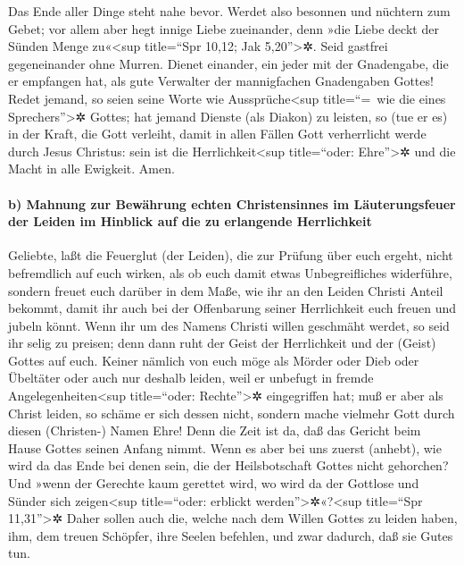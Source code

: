  Das Ende aller Dinge steht nahe bevor. Werdet also
besonnen und nüchtern zum Gebet;  vor allem aber hegt
innige Liebe zueinander, denn »die Liebe deckt der Sünden Menge
zu«\textless sup title=``Spr 10,12; Jak 5,20''\textgreater✲.
 Seid gastfrei gegeneinander ohne Murren. 
Dienet einander, ein jeder mit der Gnadengabe, die er empfangen hat, als
gute Verwalter der mannigfachen Gnadengaben Gottes! 
Redet jemand, so seien seine Worte wie Aussprüche\textless sup
title=``=~wie die eines Sprechers''\textgreater✲ Gottes; hat jemand
Dienste (als Diakon) zu leisten, so (tue er es) in der Kraft, die Gott
verleiht, damit in allen Fällen Gott verherrlicht werde durch Jesus
Christus: sein ist die Herrlichkeit\textless sup title=``oder:
Ehre''\textgreater✲ und die Macht in alle Ewigkeit. Amen.

\hypertarget{b-mahnung-zur-bewuxe4hrung-echten-christensinnes-im-luxe4uterungsfeuer-der-leiden-im-hinblick-auf-die-zu-erlangende-herrlichkeit}{%
\paragraph{b) Mahnung zur Bewährung echten Christensinnes im
Läuterungsfeuer der Leiden im Hinblick auf die zu erlangende
Herrlichkeit}\label{b-mahnung-zur-bewuxe4hrung-echten-christensinnes-im-luxe4uterungsfeuer-der-leiden-im-hinblick-auf-die-zu-erlangende-herrlichkeit}}

 Geliebte, laßt die Feuerglut (der Leiden), die zur
Prüfung über euch ergeht, nicht befremdlich auf euch wirken, als ob euch
damit etwas Unbegreifliches widerführe,  sondern freuet
euch darüber in dem Maße, wie ihr an den Leiden Christi Anteil bekommt,
damit ihr auch bei der Offenbarung seiner Herrlichkeit euch freuen und
jubeln könnt.  Wenn ihr um des Namens Christi willen
geschmäht werdet, so seid ihr selig zu preisen; denn dann ruht der Geist
der Herrlichkeit und der (Geist) Gottes auf euch.  Keiner
nämlich von euch möge als Mörder oder Dieb oder Übeltäter oder auch nur
deshalb leiden, weil er unbefugt in fremde Angelegenheiten\textless sup
title=``oder: Rechte''\textgreater✲ eingegriffen hat; muß er aber als
Christ leiden,  so schäme er sich dessen nicht, sondern
mache vielmehr Gott durch diesen (Christen-) Namen Ehre! 
Denn die Zeit ist da, daß das Gericht beim Hause Gottes seinen Anfang
nimmt. Wenn es aber bei uns zuerst (anhebt), wie wird da das Ende bei
denen sein, die der Heilsbotschaft Gottes nicht gehorchen?
 Und »wenn der Gerechte kaum gerettet wird, wo wird da
der Gottlose und Sünder sich zeigen\textless sup title=``oder: erblickt
werden''\textgreater✲«?\textless sup title=``Spr 11,31''\textgreater✲
 Daher sollen auch die, welche nach dem Willen Gottes zu
leiden haben, ihm, dem treuen Schöpfer, ihre Seelen befehlen, und zwar
dadurch, daß sie Gutes tun.

